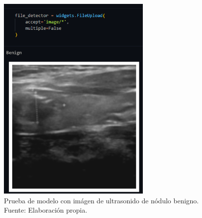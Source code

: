 \begin{figure}[H]
	\begin{center}
		\includegraphics[width=0.67\textwidth]{4/figures/simulacion_modelo_benign.PNG}
		\caption[Prueba de modelo con imágen de ultrasonido de nódulo benigno]{Prueba de modelo con imágen de ultrasonido de nódulo benigno. \\
		Fuente: Elaboración propia.}
		\label{4:fig171}
	\end{center}
\end{figure}
